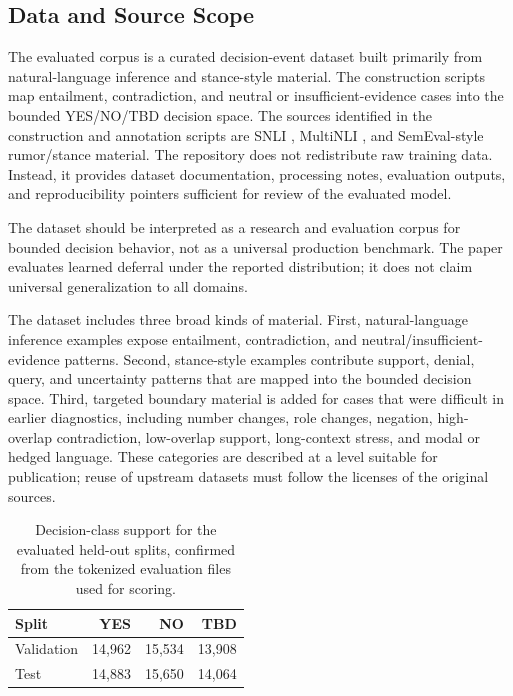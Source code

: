 \documentclass[11pt]{article}
\begin{document}
\subsection{Data and Source Scope}

The evaluated corpus is a curated decision-event dataset built primarily from natural-language inference and stance-style material. The construction scripts map entailment, contradiction, and neutral or insufficient-evidence cases into the bounded YES/NO/TBD decision space. The sources identified in the construction and annotation scripts are SNLI \cite{bowman2015snli}, MultiNLI \cite{williams2018broad}, and SemEval-style rumor/stance material. The repository does not redistribute raw training data. Instead, it provides dataset documentation, processing notes, evaluation outputs, and reproducibility pointers sufficient for review of the evaluated model.

The dataset should be interpreted as a research and evaluation corpus for bounded decision behavior, not as a universal production benchmark. The paper evaluates learned deferral under the reported distribution; it does not claim universal generalization to all domains.

The dataset includes three broad kinds of material. First, natural-language inference examples expose entailment, contradiction, and neutral/insufficient-evidence patterns. Second, stance-style examples contribute support, denial, query, and uncertainty patterns that are mapped into the bounded decision space. Third, targeted boundary material is added for cases that were difficult in earlier diagnostics, including number changes, role changes, negation, high-overlap contradiction, low-overlap support, long-context stress, and modal or hedged language. These categories are described at a level suitable for publication; reuse of upstream datasets must follow the licenses of the original sources.

\begin{table}[htbp]
\centering
\begin{tabular}{lrrr}
\toprule
Split & YES & NO & TBD \\
\midrule
Validation & 14,962 & 15,534 & 13,908 \\
Test & 14,883 & 15,650 & 14,064 \\
\bottomrule
\end{tabular}
\caption{Decision-class support for the evaluated held-out splits, confirmed from the tokenized evaluation files used for scoring.}
\end{table}
\end{document}
